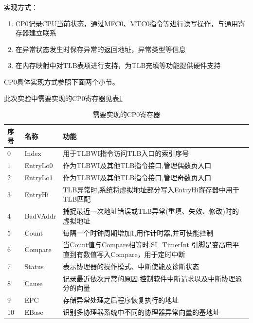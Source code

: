             实现方式：
            \begin{enumerate}
                \item
                    CP0记录CPU当前状态，通过MFC0、MTC0指令等进行读写操作，与通用寄存器建立联系
                \item
                    在异常状态发生时保存异常的返回地址，异常类型等信息
                \item
                    在内存映射中对TLB表项进行支持，为TLB充填等功能提供硬件支持
            \end{enumerate}

            CP0具体实现方式参照下面两个小节。

            此次实验中需要实现的CP0寄存器见表\ref{table_cp0_reg}

            \begin{table}
            \centering
            \caption{需要实现的CP0寄存器}\label{table_cp0_reg}
            \begin{tabularx}{\textwidth}{|l|l|X|}
            \hline
            序号 & 名称 & 功能 \\
            \hline
            0 & Index & 用于TLBWI指令访问TLB入口的索引序号 \\
            \hline
            1 & EntryLo0 & 作为TLBWI及其他TLB指令接口,管理偶数页入口 \\
            \hline
            2 & EntryLo1 & 作为TLBWI及其他TLB指令接口,管理奇数页入口 \\
            \hline
            3 & EntryHi & TLB异常时,系统将虚拟地址部分写入EntryHi寄存器中用于TLB匹配 \\
            \hline
            4 & BadVAddr & 捕捉最近一次地址错误或TLB异常(重填、失效、修改)时的虚拟地址 \\
            \hline
            5 & Count & 每隔一个时钟周期增加1,用作计时器,并可使能控制 \\
            \hline
            6 & Compare & 当Count值与Compare相等时,SI\_TimerInt 引脚是变高电平直到有数值写入Compare，用于定时中断 \\
            \hline
            7 & Status & 表示协理器的操作模式、中断使能及诊断状态 \\
            \hline
            8 & Cause & 记录最近依次异常的原因,控制软件中断请求以及中断协理派分的向量 \\
            \hline
            9 & EPC & 存储异常处理之后程序恢复执行的地址 \\
            \hline
            10 & EBase & 识别多协理器系统中不同的协理器异常向量的基地址 \\
            \hline
            \end{tabularx}
            \end{table}

